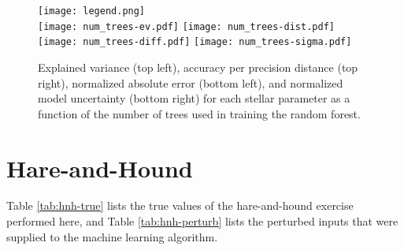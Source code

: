 \documentclass[manuscript,linenumbers]{aastex6}
\begin{document}
\begin{figure*}
    \centering
    \texttt{[image: legend.png]}\\
    \texttt{[image: num\_trees-ev.pdf]}%
    \texttt{[image: num\_trees-dist.pdf]}\\
    \texttt{[image: num\_trees-diff.pdf]}%
    \texttt{[image: num\_trees-sigma.pdf]}\\
    \caption{Explained variance (top left), accuracy per precision distance (top right), normalized absolute error (bottom left), and normalized model uncertainty (bottom right) for each stellar parameter as a function of the number of trees used in training the random forest. 
    \label{fig:app-evaluation-trees}} 
\end{figure*}


\section{Hare-and-Hound}
\label{sec:hare-and-hound}
Table \ref{tab:hnh-true} lists the true values of the hare-and-hound exercise performed here, and Table \ref{tab:hnh-perturb} lists the perturbed inputs that were supplied to the machine learning algorithm. 
\end{document}
